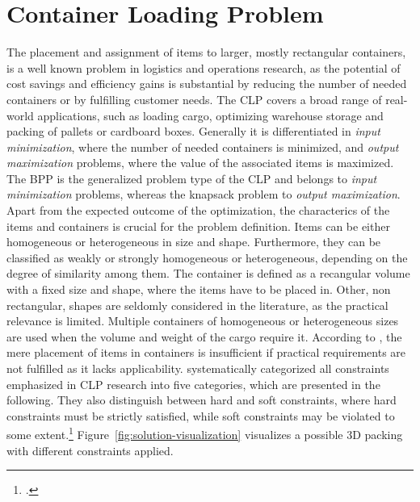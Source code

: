 \section{Container Loading Problem}
\label{sec:clp_definition}

The placement and assignment of items to larger, mostly rectangular
containers, is a well known problem in logistics and operations research, as the
potential of cost savings and efficiency gains is substantial by reducing the number
of needed containers or by fulfilling customer needs. The \gls{CLP} covers a broad range of real-world applications,
such as loading cargo, optimizing warehouse storage and packing of pallets or cardboard boxes.
Generally it is differentiated in \textit{input minimization},
where the number of needed containers is minimized, and \textit{output maximization} problems,
where the value of the associated items is maximized. The \gls{BPP} is the generalized problem type of the \gls{CLP}
and belongs to \textit{input minimization} problems, whereas the knapsack problem to \textit{output maximization}. Apart from the expected outcome of the optimization,
the characterics of the items and containers is crucial for the problem definition. Items can be either
homogeneous or heterogeneous in size and shape. Furthermore, they can be classified as weakly or strongly
homogeneous or heterogeneous, depending on the degree of similarity among them. The container is
defined as a recangular volume with a fixed size and shape, where the items have to be placed in.
Other, non rectangular, shapes are seldomly considered in the literature, as the practical relevance is
limited. Multiple containers of homogeneous or heterogeneous sizes are used when the volume and weight
of the cargo require it.
According to \textcite{bischoff_issues_1995}, the mere placement of items in containers is insufficient
if practical requirements are not fulfilled as it lacks applicability.
\textcite{bortfeldt_constraints_2013} systematically categorized all constraints emphasized in \gls{CLP} research
into five categories, which are presented in the following. They also distinguish between hard and soft constraints,
where hard constraints must be strictly satisfied, while soft constraints may be violated
to some extent.\footcites[cf.][pp. 1f]{bortfeldt_constraints_2013}[cf.][pp. 1--2]{bischoff_issues_1995}
Figure~\ref{fig:solution-visualization} visualizes a possible 3D packing with different constraints applied.

